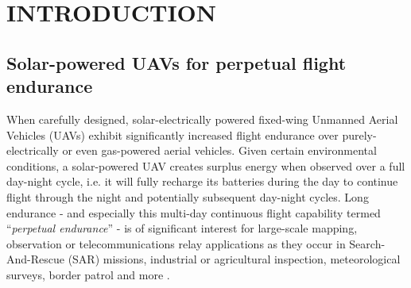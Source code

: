 \section{INTRODUCTION}

\subsection{Solar-powered UAVs for perpetual flight endurance}

When carefully designed, solar-electrically powered fixed-wing Unmanned Aerial Vehicles (UAVs) exhibit significantly increased flight endurance over purely-electrically or even gas-powered aerial vehicles. Given certain environmental conditions, a solar-powered UAV creates surplus energy when observed over a full day-night cycle, i.e. it will fully recharge its batteries during the day to continue flight through the night and potentially subsequent day-night cycles. Long endurance - and especially this multi-day continuous flight capability termed ``\textit{perpetual endurance}'' - is of significant interest for large-scale mapping, observation or telecommunications relay applications as they occur in Search-And-Rescue (SAR) missions, industrial or agricultural inspection, meteorological surveys, border patrol and more \cite{NASA_Pathfinder}.
 
